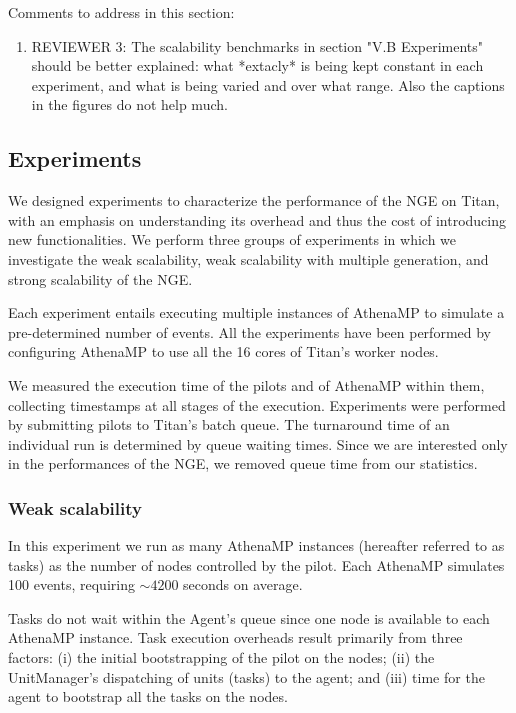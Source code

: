 \ifreview
Comments to address in this section:
\begin{enumerate}
    \color{red} 
    \item REVIEWER 3: The scalability benchmarks in section "V.B Experiments"
    should be better explained: what *extacly* is being kept constant in each
    experiment, and what is being varied and over what range. Also the
    captions in the figures do not help much.
\end{enumerate}
\fi

\subsection{Experiments}\label{sec:ngeExp}

We designed experiments to characterize the performance of the NGE on Titan,
with an emphasis on understanding its overhead and thus the cost of
introducing new functionalities. We perform three groups of experiments in
which we investigate the weak scalability, weak scalability with multiple
generation, and strong scalability of the NGE.

Each experiment entails executing multiple instances of AthenaMP to simulate
a pre-determined number of events. All the experiments have been performed by
configuring AthenaMP to use all the 16 cores of Titan's worker nodes.

We measured the execution time of the pilots and of AthenaMP within them,
collecting timestamps at all stages of the execution. Experiments were
performed by submitting pilots to Titan's batch queue. The turnaround
time of an individual run is determined by queue waiting times. Since we are
interested only in the performances of the NGE, we removed queue time from
our statistics.

\subsubsection{Weak scalability}

In this experiment we run as many AthenaMP instances (hereafter referred to
as tasks) as the number of nodes controlled by the pilot. Each AthenaMP
simulates 100 events, requiring \(\sim 4200\) seconds on average.

Tasks do not wait within the Agent's queue since one node is available to
each AthenaMP instance. Task execution  overheads result primarily from
three factors: (i) the initial bootstrapping of the pilot on the nodes; (ii)
the UnitManager's dispatching of units (tasks) to the agent; and (iii) time
for the agent to bootstrap all the tasks on the nodes.

